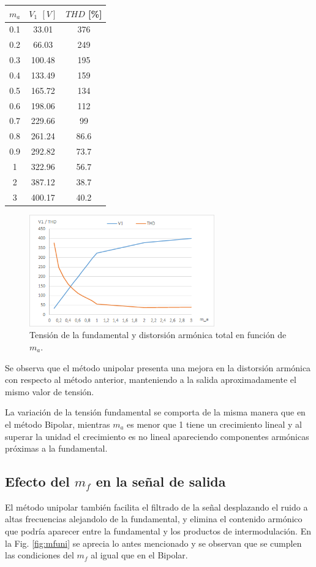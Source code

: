 \documentclass[conference]{IEEEtran}
\begin{document}
\begin{center}
	\begin{tabular}{|c|c|c|}
		\hline
		$m_a$& $V_1$ $[V]$ & $THD$ [\%] \\ 
		\hline 
		0.1 & 33.01 & 376 \\ 
		0.2	& 66.03 & 249\\ 
		0.3	& 100.48 & 195 \\ 
		0.4 & 133.49 & 159 \\ 
		0.5 & 165.72 & 134 \\ 
		0.6 & 198.06 & 112 \\ 
		0.7 & 229.66 & 99 \\ 
		0.8 & 261.24 & 86.6 \\ 
		0.9 & 292.82 & 73.7 \\ 
		1 & 322.96 & 56.7 \\ 
		2 & 387.12 & 38.7 \\ 
		3 & 400.17 & 40.2 \\ 
		\hline 
	\end{tabular} 
\end{center} 

\begin{figure}[t]
	\centering
	\includegraphics[width=8cm]{imagenes/unipolar/thd}
	\caption{Tensión de la fundamental y distorsión armónica total en función de $m_a$.}
	\label{fig:thduni}
\end{figure}

Se observa que el método unipolar presenta una mejora en la distorsión armónica con respecto al método anterior, manteniendo a la salida aproximadamente el mismo valor de tensión. 

La variación de la tensión fundamental se comporta de la misma manera que en el método Bipolar, mientras $m_a$ es menor que 1 tiene un crecimiento lineal y al superar la unidad el crecimiento es no lineal apareciendo componentes armónicas próximas a la fundamental.

\subsection{Efecto del $m_f$ en la señal de salida}
El método unipolar también facilita el filtrado de la señal desplazando el ruido a altas frecuencias alejandolo de la fundamental, y elimina el contenido armónico que podría aparecer entre la fundamental y los productos de intermodulación. En la Fig. \ref{fig:mfuni} se aprecia lo antes mencionado y se observan que se cumplen las condiciones del $m_f$ al igual que en el Bipolar.
\end{document}
